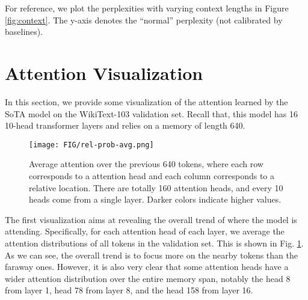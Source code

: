 \documentclass[11pt,a4paper]{article}
\begin{document}
For reference, we plot the perplexities with varying context lengths in Figure \ref{fig:context}. The y-axis denotes the ``normal'' perplexity (not calibrated by baselines).

\section{Attention Visualization}
In this section, we provide some visualization of the attention learned by the SoTA model on the WikiText-103 validation set.
Recall that, this model has 16 10-head transformer layers and relies on a memory of length 640.

\begin{figure}[!h]
	\texttt{[image: FIG/rel-prob-avg.png]}
	\caption{Average attention over the previous 640 tokens, where each row corresponds to a attention head and each column corresponds to a relative location. There are totally 160 attention heads, and every 10 heads come from a single layer. Darker colors indicate higher values.}
	\label{fig:visattn-global}
\end{figure}
The first visualization aims at revealing the overall trend of where the model is attending.
Specifically, for each attention head of each layer, we average the attention distributions of all tokens in the validation set.
This is shown in Fig. \ref{fig:visattn-global}. As we can see, the overall trend is to focus more on the nearby tokens than the faraway ones.
However, it is also very clear that some attention heads have a wider attention distribution over the entire memory span, notably the head 8 from layer 1, head 78 from layer 8, and the head 158 from layer 16.
\end{document}
